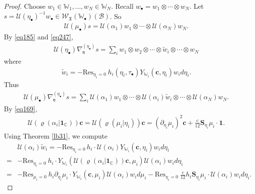 \documentclass[12pt,a4paper,notitlepage]{report}
\theoremstyle{definition}
\theoremstyle{plain}
\newcommand{\fk}{\mathfrak}
\newcommand{\mc}{\mathcal}
\newcommand{\wtd}{\widetilde}
\newcommand{\wht}{\widehat}
\newcommand{\id}{\mathbf{1}}
\newcommand{\Res}{\mathrm{Res}}
\newcommand{\scr}{\mathscr}
\newcommand{\yk}{\mathfrak y}
\newcommand{\blt}{\bullet}
\newcommand{\Wbb}{\mathbb W}
\newcommand{\Cbb}{\mathbb C}
\newcommand{\cbf}{\mathbf c}
\newcommand{\Sbf}{\mathbf{S}}
\numberwithin{equation}{section}
\begin{document}
\begin{proof}
	
	
Choose $w_1\in\Wbb_1,\dots,w_N\in\Wbb_N$. Recall $w_\blt=w_1\otimes\cdots\otimes w_N$. Let $s=\mc U(\eta_\blt)^{-1}w_\blt\in\scr W_{\fk X}(\Wbb_\blt)(\mc B)$. So
\begin{align}
\mc U(\mu_\blt)s=\mc U(\alpha_1)w_1\otimes\cdots\otimes \mc U(\alpha_N)w_N.\label{eq250}
\end{align}
By \eqref{eq185} and \eqref{eq247}, 
\begin{align*}
\mc U(\eta_\blt)\nabla_\yk^{(\eta_\blt)} s=\sum_i w_1\otimes w_2\otimes\cdots\otimes \wtd w_i\otimes\cdots\otimes w_N
\end{align*}
where
\begin{align*}
\wtd w_i=-\Res_{\eta_i=0}~h_i(\eta_i,\tau_\blt)Y_{\Wbb_i}(\cbf,\eta_i)w_i d\eta_i.
\end{align*}
Thus
\begin{align}
\mc U(\mu_\blt)\nabla_\yk^{(\eta_\blt)} s=\sum_i \mc U(\alpha_1)w_1\otimes\cdots\otimes \mc U(\alpha_i)\wtd w_i\otimes\cdots\otimes\mc U(\alpha_N) w_N.\label{eq251}
\end{align}
By \eqref{eq169},
\begin{align*}
\mc U(\varrho(\alpha_i|\id_\Cbb))\cbf=\mc U(\varrho(\mu_i|\eta_i))\cbf=(\partial_{\eta_i}\mu_i)^2\cbf+\frac c{12}\Sbf_{\eta_i}\mu_i\cdot\id.
\end{align*}
Using Theorem \ref{lb31}, we compute
\begin{align}
&\mc U(\alpha_i)\wtd w_i=-\Res_{\eta_i=0~}h_i\cdot\mc  U(\alpha_i)Y_{\Wbb_i}(\cbf,\eta_i)w_i d\eta_i\nonumber\\
=&-\Res_{\eta_i=0}~h_i\cdot  Y_{\Wbb_i}(\mc U(\varrho(\alpha_i|\id_\Cbb))\cbf,\mu_i)\mc U(\alpha_i)w_i d\eta_i\nonumber\\
=&-\Res_{\mu_i=0}~h_i \partial_{\eta_i}\mu_i\cdot Y_{\Wbb_i}(\cbf,\mu_i)\mc U(\alpha_i)w_i d\mu_i-\Res_{\eta_i=0}~ \frac c{12}h_i\Sbf_{\eta_i}\mu_i\cdot \mc U(\alpha_i)w_i d\eta_i.\label{eq252}
\end{align}







\end{proof}
\end{document}
